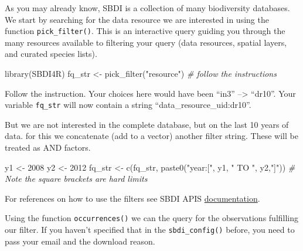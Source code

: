 \documentclass[
  10pt,
]{article}
\newenvironment{Shaded}{\begin{snugshade}}{\end{snugshade}}
\newcommand{\CommentTok}[1]{\textcolor[rgb]{0.56,0.35,0.01}{\textit{#1}}}
\newcommand{\DecValTok}[1]{\textcolor[rgb]{0.00,0.00,0.81}{#1}}
\newcommand{\FunctionTok}[1]{\textcolor[rgb]{0.00,0.00,0.00}{#1}}
\newcommand{\NormalTok}[1]{#1}
\newcommand{\OtherTok}[1]{\textcolor[rgb]{0.56,0.35,0.01}{#1}}
\newcommand{\StringTok}[1]{\textcolor[rgb]{0.31,0.60,0.02}{#1}}
\begin{document}
As you may already know, SBDI is a collection of many biodiversity databases. We start by searching for the data resource we are interested in using the function \texttt{pick\_filter()}. This is an interactive query guiding you through the many resources available to filtering your query (data resources, spatial layers, and curated species lists).

\begin{Shaded}
\begin{Highlighting}[]
\FunctionTok{library}\NormalTok{(SBDI4R)}
\NormalTok{fq\_str }\OtherTok{\textless{}{-}} \FunctionTok{pick\_filter}\NormalTok{(}\StringTok{"resource"}\NormalTok{) }
\CommentTok{\# follow the instructions }
\end{Highlighting}
\end{Shaded}

Follow the instruction. Your choices here would have been ``in3'' --\textgreater{} ``dr10''. Your variable \texttt{fq\_str} will now contain a string ``data\_resource\_uid:dr10''.

But we are not interested in the complete database, but on the last 10 years of data. for this we concatenate (add to a vector) another filter string. These will be treated as AND factors.

\begin{Shaded}
\begin{Highlighting}[]
\NormalTok{y1 }\OtherTok{\textless{}{-}} \DecValTok{2008}
\NormalTok{y2 }\OtherTok{\textless{}{-}} \DecValTok{2012}
\NormalTok{fq\_str }\OtherTok{\textless{}{-}} \FunctionTok{c}\NormalTok{(fq\_str, }\FunctionTok{paste0}\NormalTok{(}\StringTok{"year:["}\NormalTok{, y1, }\StringTok{" TO "}\NormalTok{, y2,}\StringTok{"]"}\NormalTok{))}
\CommentTok{\# Note the square brackets are hard limits}
\end{Highlighting}
\end{Shaded}

For references on how to use the filters see SBDI APIS \href{https://api.biodiversitydata.se/?lang=en-US\#ws3}{documentation}.

Using the function \texttt{occurrences()} we can the query for the observations fulfilling our filter. If you haven't specified that in the \texttt{sbdi\_config()} before, you need to pass your email and the download reason.
\end{document}
